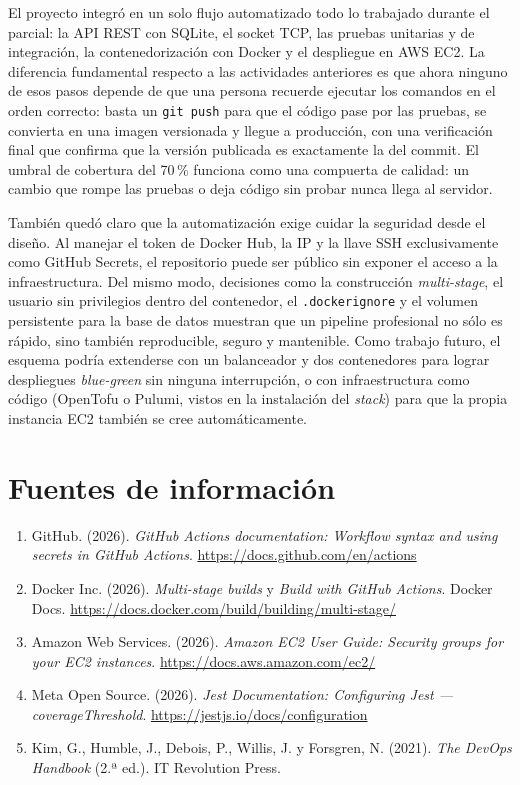 \documentclass[12pt,letterpaper]{article}
\begin{document}
El proyecto integró en un solo flujo automatizado todo lo trabajado durante el parcial: la API REST con SQLite, el socket TCP, las pruebas unitarias y de integración, la contenedorización con Docker y el despliegue en AWS EC2. La diferencia fundamental respecto a las actividades anteriores es que ahora ninguno de esos pasos depende de que una persona recuerde ejecutar los comandos en el orden correcto: basta un \texttt{git push} para que el código pase por las pruebas, se convierta en una imagen versionada y llegue a producción, con una verificación final que confirma que la versión publicada es exactamente la del commit. El umbral de cobertura del 70\,\% funciona como una compuerta de calidad: un cambio que rompe las pruebas o deja código sin probar nunca llega al servidor.

También quedó claro que la automatización exige cuidar la seguridad desde el diseño. Al manejar el token de Docker Hub, la IP y la llave SSH exclusivamente como GitHub Secrets, el repositorio puede ser público sin exponer el acceso a la infraestructura. Del mismo modo, decisiones como la construcción \textit{multi-stage}, el usuario sin privilegios dentro del contenedor, el \texttt{.dockerignore} y el volumen persistente para la base de datos muestran que un pipeline profesional no sólo es rápido, sino también reproducible, seguro y mantenible. Como trabajo futuro, el esquema podría extenderse con un balanceador y dos contenedores para lograr despliegues \textit{blue-green} sin ninguna interrupción, o con infraestructura como código (OpenTofu o Pulumi, vistos en la instalación del \textit{stack}) para que la propia instancia EC2 también se cree automáticamente.

\section{Fuentes de información}
\begin{enumerate}
  \item GitHub. (2026). \textit{GitHub Actions documentation: Workflow syntax and using secrets in GitHub Actions}. \url{https://docs.github.com/en/actions}
  \item Docker Inc. (2026). \textit{Multi-stage builds} y \textit{Build with GitHub Actions}. Docker Docs. \url{https://docs.docker.com/build/building/multi-stage/}
  \item Amazon Web Services. (2026). \textit{Amazon EC2 User Guide: Security groups for your EC2 instances}. \url{https://docs.aws.amazon.com/ec2/}
  \item Meta Open Source. (2026). \textit{Jest Documentation: Configuring Jest --- coverageThreshold}. \url{https://jestjs.io/docs/configuration}
  \item Kim, G., Humble, J., Debois, P., Willis, J. y Forsgren, N. (2021). \textit{The DevOps Handbook} (2.ª ed.). IT Revolution Press.
\end{enumerate}
\end{document}
